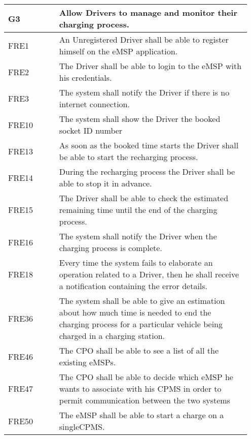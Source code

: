 {\renewcommand{\arraystretch}{1.5}
\begin{longtable}{|p{0.20\linewidth}p{0.75\linewidth} |}
    \hline
    \rowcolor{bluepoli!40}\textbf{G3} & \textbf{Allow Drivers to manage and monitor their charging process.} \\
    \hline
    \rowcolor{bluepoli!15} FRE1 & An Unregistered Driver shall be able to register himself on the eMSP application. \\
    \hline
    \rowcolor{bluepoli!15} FRE2 & The Driver shall be able to login to the eMSP with his credentials. \\
    \hline 
    \rowcolor{bluepoli!15} FRE3 & The system shall notify the Driver if there is no internet connection. \\
    \hline 
    \rowcolor{bluepoli!15}
    FRE10\textbf &The system shall show the Driver the booked socket ID number\\
    \hline
    \rowcolor{bluepoli!15} FRE13 & As soon as the booked time starts the Driver shall be able to start the recharging process. \\
    \hline
    \rowcolor{bluepoli!15} FRE14 & During the recharging process the Driver shall be able to stop it in advance. \\
    \hline
    \rowcolor{bluepoli!15} FRE15 & The Driver shall be able to check the estimated remaining time until the end of the charging process. \\
    \hline
    \rowcolor{bluepoli!15} FRE16 & The system shall notify the Driver when the charging process is complete. \\
    \hline
    \rowcolor{bluepoli!15} FRE18 & Every time the system fails to elaborate an operation related to a Driver, then he shall receive a notification containing the error details. \\
    \hline
    \rowcolor{bluepoli!15} FRE36 & The system shall be able to give an estimation about how much time is needed to end the charging process for a particular vehicle being charged in a charging station. \\
    \hline
    \rowcolor{bluepoli!15}
    FRE46 & The CPO shall be able to see a list of all the existing eMSPs. \\
    \hline
    \rowcolor{bluepoli!15} FRE47 &  The CPO shall be able to decide which eMSP he wants to associate with his CPMS in order to permit communication between the two systems \\
    \hline
    \rowcolor{bluepoli!15} FRE50 & The eMSP shall be able to start a charge on a singleCPMS. \\

\end{longtable}}
